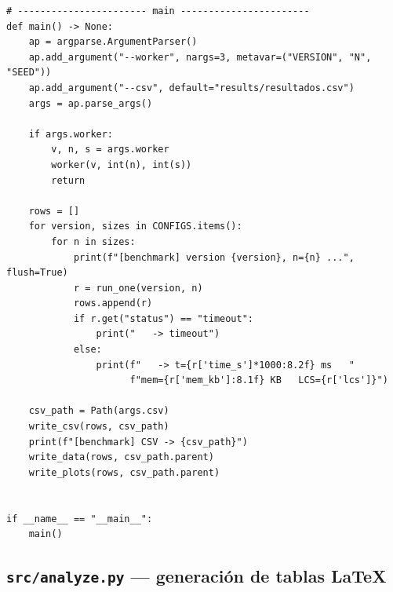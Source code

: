 \documentclass[11pt,a4paper]{article}
\begin{document}
\begin{lstlisting}[style=py, caption={\texttt{src/benchmark.py}}]
# ----------------------- main -----------------------
def main() -> None:
    ap = argparse.ArgumentParser()
    ap.add_argument("--worker", nargs=3, metavar=("VERSION", "N", "SEED"))
    ap.add_argument("--csv", default="results/resultados.csv")
    args = ap.parse_args()

    if args.worker:
        v, n, s = args.worker
        worker(v, int(n), int(s))
        return

    rows = []
    for version, sizes in CONFIGS.items():
        for n in sizes:
            print(f"[benchmark] version {version}, n={n} ...", flush=True)
            r = run_one(version, n)
            rows.append(r)
            if r.get("status") == "timeout":
                print("   -> timeout")
            else:
                print(f"   -> t={r['time_s']*1000:8.2f} ms   "
                      f"mem={r['mem_kb']:8.1f} KB   LCS={r['lcs']}")

    csv_path = Path(args.csv)
    write_csv(rows, csv_path)
    print(f"[benchmark] CSV -> {csv_path}")
    write_data(rows, csv_path.parent)
    write_plots(rows, csv_path.parent)


if __name__ == "__main__":
    main()
\end{lstlisting}

\subsection{\texttt{src/analyze.py} — generación de tablas LaTeX}\label{anexo:analyze}
\end{document}
